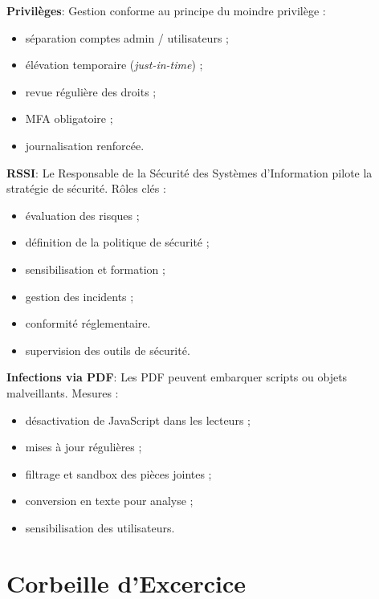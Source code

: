 \vspace{0.5cm}

\noindent \textbf{Privilèges}:
Gestion conforme au principe du moindre privilège :
\begin{itemize}
    \item séparation comptes admin / utilisateurs ;
    \item élévation temporaire (\textit{just-in-time}) ;
    \item revue régulière des droits ;
    \item MFA obligatoire ;
    \item journalisation renforcée.
\end{itemize}

\vspace{0.5cm}

\noindent \textbf{RSSI}:
Le Responsable de la Sécurité des Systèmes d'Information pilote la stratégie de sécurité.
Rôles clés :
\begin{itemize}
    \item évaluation des risques ;
    \item définition de la politique de sécurité ;
    \item sensibilisation et formation ;
    \item gestion des incidents ;
    \item conformité réglementaire.
    \item supervision des outils de sécurité.
\end{itemize}

\vspace{0.5cm}

\noindent \textbf{Infections via PDF}:
Les PDF peuvent embarquer scripts ou objets malveillants.  
Mesures :
\begin{itemize}
    \item désactivation de JavaScript dans les lecteurs ;
    \item mises à jour régulières ;
    \item filtrage et sandbox des pièces jointes ;
    \item conversion en texte pour analyse ;
    \item sensibilisation des utilisateurs.
\end{itemize}

\newpage

\section*{Corbeille d'Excercice}

